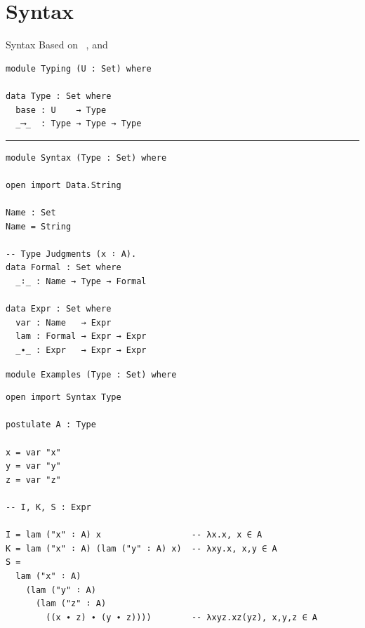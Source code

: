 \documentclass[10pt, xetex, hyperref={pdfpagelabels=false}]{beamer}
\begin{document}
\section{Syntax}
\begin{frame}[fragile]{Syntax Based on ~\citep{cactus}, and \citep{nad}}
\vfill
\begin{verbatim}
module Typing (U : Set) where

data Type : Set where
  base : U    → Type
  _⟶_  : Type → Type → Type
\end{verbatim}

\vfill
{\color{plum!45!black}\rule{\textwidth}{0.5pt}}
\vfill

\begin{verbatim}
module Syntax (Type : Set) where

open import Data.String

Name : Set
Name = String

-- Type Judgments (x ∶ A).
data Formal : Set where
  _∶_ : Name → Type → Formal

data Expr : Set where
  var : Name   → Expr
  lam : Formal → Expr → Expr
  _∙_ : Expr   → Expr → Expr
\end{verbatim}
\vfill
\end{frame}

\begin{frame}[fragile]{\texttt{module Examples (Type : Set) where}}
\begin{verbatim}
open import Syntax Type

postulate A : Type

x = var "x"
y = var "y"
z = var "z"

-- I, K, S : Expr

I = lam ("x" ∶ A) x                  -- λx.x, x ∈ A
K = lam ("x" ∶ A) (lam ("y" ∶ A) x)  -- λxy.x, x,y ∈ A
S =
  lam ("x" ∶ A)
    (lam ("y" ∶ A)
      (lam ("z" ∶ A)
        ((x ∙ z) ∙ (y ∙ z))))        -- λxyz.xz(yz), x,y,z ∈ A
\end{verbatim}
\end{frame}
\end{document}
